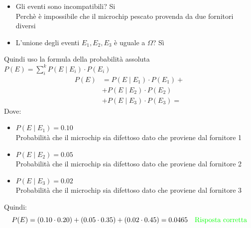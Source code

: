 \documentclass{article}  %
\theoremstyle{definition}
\begin{document}
\begin{esercizio}[Esercizio]
\begin{itemize}
\begin{itemize}
		      \end{itemize}
		\item Gli eventi sono incompatibili? Si \\
		      Perchè è impossibile che il microchip pescato provenda da due fornitori diversi
		\item L'unione degli eventi $E_1,E_2,E_3$ è uguale a $\Omega$? Sì \\
	\end{itemize}
	Quindi uso la formula della probabilità assoluta $P(E) = \sum_{i}^{k} P(E \mid E_i) \cdot P(E_i)$
	\begin{align*}
		P(E)
		 & = P(E \mid E_1) \cdot P(E_1) + \\
		 & + P(E \mid E_2) \cdot P(E_2)   \\
		 & + P(E \mid E_3) \cdot P(E_3) =
	\end{align*}
	Dove:
	\begin{itemize}
		\item $P(E \mid E_1)=0.10$ \\
		      Probabilità che il microchip sia difettoso dato che proviene dal fornitore 1
		\item $P(E \mid E_2)=0.05$ \\
		      Probabilità che il microchip sia difettoso dato che proviene dal fornitore 2
		\item $P(E \mid E_3)=0.02$ \\
		      Probabilità che il microchip sia difettoso dato che proviene dal fornitore 3
	\end{itemize}
	Quindi:
	\[
		P(E)=(0.10 \cdot 0.20)+(0.05 \cdot 0.35)+(0.02 \cdot 0.45)=0.0465 \quad \textcolor{green}{\text{Risposta corretta}}
	\]
\end{esercizio}
\end{document}
